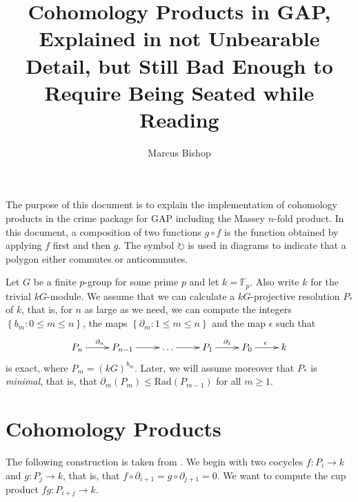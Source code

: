 \documentclass[12pt]{article}
\title{Cohomology Products in \textsf{GAP}, Explained in not Unbearable 
Detail, but Still Bad Enough to Require Being Seated while Reading}
\author{Marcus Bishop}
\begin{document}
\maketitle
The purpose of this document is to explain
the implementation of cohomology products in the 
\textsf{crime} package for \textsf{GAP} including the Massey $n$-fold
product. In this document, a composition of two functions
$g\circ f$ is the function obtained by applying $f$ first 
and then $g$. The symbol $\circlearrowright$ is used
in diagrams to indicate that a polygon either commutes
or anticommutes. 

Let $G$ be a finite $p$-group for some prime $p$
and let $k=\mathbb{F}_p$. Also write $k$ for the
trivial $kG$-module. We assume that we can
calculate a $kG$-projective resolution $P_\ast$
of $k$, that is, for $n$ as large as we need,
we can compute the integers
$\left\{b_m:0\le m\le n\right\}$, the
maps $\left\{\partial_m:1\le m\le n\right\}$
and the map $\epsilon$ such that
\begin{equation}\label{proj}
\xymatrix{P_n\ar[r]^{\partial_n}
&P_{n-1}\ar[r]&\dots\ar[r]
&P_1\ar[r]^{\partial_1}
&P_0\ar[r]^{\epsilon}&k}\end{equation}
is exact, where $P_m=\left(kG\right)^{b_m}$.
Later, we will assume moreover that $P_\ast$ is {\em minimal},
that is, that $\partial_m\left(P_m\right)\le 
\mathrm{Rad}\left(P_{m-1}\right)$ for all $m\ge 1$.

\section{Cohomology Products}\label{cp}
The following construction is taken from \cite{carlson}.
We begin with two cocycles $f:P_i\to k$ and $g:P_j\to k$,
that is, that $f\circ\partial_{i+1}=g\circ\partial_{j+1}=0$.
We want to compute the cup product $fg:P_{i+j}\to k$.
\end{document}
